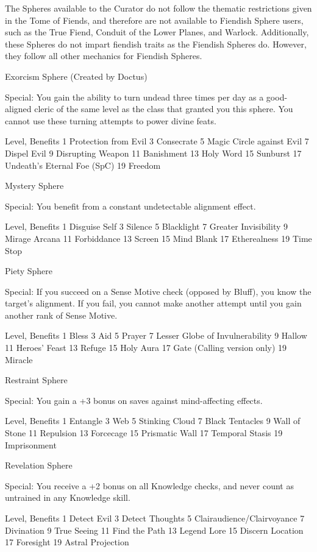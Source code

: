 The Spheres available to the Curator do not follow the thematic restrictions given in the Tome of Fiends, and therefore are not available to Fiendish Sphere users, such as the True Fiend, Conduit of the Lower Planes, and Warlock. Additionally, these Spheres do not impart fiendish traits as the Fiendish Spheres do. However, they follow all other mechanics for Fiendish Spheres.

Exorcism Sphere
(Created by Doctus)

Special: You gain the ability to turn undead three times per day as a good-aligned cleric of the same level as the class that granted you this sphere. You cannot use these turning attempts to power divine feats.

Level, Benefits
1 Protection from Evil
3 Consecrate
5 Magic Circle against Evil
7 Dispel Evil
9 Disrupting Weapon
11 Banishment
13 Holy Word
15 Sunburst
17 Undeath's Eternal Foe (SpC)
19 Freedom


Mystery Sphere

Special: You benefit from a constant undetectable alignment effect.

Level, Benefits
1 Disguise Self
3 Silence
5 Blacklight
7 Greater Invisibility
9 Mirage Arcana
11 Forbiddance
13 Screen
15 Mind Blank
17 Etherealness
19 Time Stop


Piety Sphere

Special: If you succeed on a Sense Motive check (opposed by Bluff), you know the target's alignment. If you fail, you cannot make another attempt until you gain another rank of Sense Motive.

Level, Benefits
1 Bless
3 Aid
5 Prayer
7 Lesser Globe of Invulnerability
9 Hallow
11 Heroes' Feast
13 Refuge
15 Holy Aura
17 Gate (Calling version only)
19 Miracle


Restraint Sphere

Special: You gain a +3 bonus on saves against mind-affecting effects.

Level, Benefits
1 Entangle
3 Web
5 Stinking Cloud
7 Black Tentacles
9 Wall of Stone
11 Repulsion
13 Forcecage
15 Prismatic Wall
17 Temporal Stasis
19 Imprisonment


Revelation Sphere

Special: You receive a +2 bonus on all Knowledge checks, and never count as untrained in any Knowledge skill.

Level, Benefits
1 Detect Evil
3 Detect Thoughts
5 Clairaudience/Clairvoyance
7 Divination
9 True Seeing
11 Find the Path
13 Legend Lore
15 Discern Location
17 Foresight
19 Astral Projection



